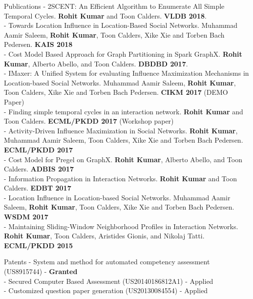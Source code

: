 \documentclass{resume} %
\begin{document}
\begin{rSection}{Publications}
- 2SCENT: An Efficient Algorithm to Enumerate All Simple Temporal Cycles. \textbf{Rohit Kumar} and Toon Calders. \textbf{VLDB 2018}.\\
- Towards Location Influence in Location-Based Social Networks. Muhammad Aamir Saleem, \textbf{Rohit Kumar}, Toon Calders, Xike Xie and Torben Bach Pedersen. \textbf{KAIS 2018}\\
- Cost Model Based Approach for Graph Partitioning in Spark GraphX.
 \textbf{Rohit Kumar}, Alberto Abello, and Toon Calders. \textbf{DBDBD 2017}.\\
- IMaxer: A Unified System for evaluating Influence Maximization Mechanisms in Location-based Social Networks.
 Muhammad Aamir Saleem, \textbf{Rohit Kumar}, Toon Calders, Xike Xie and Torben Bach Pedersen. \textbf{CIKM 2017} (DEMO Paper)\\
- Finding simple temporal cycles in an interaction network.
 \textbf{Rohit Kumar} and Toon Calders. \textbf{ECML/PKDD 2017} (Workshop paper)\\
- Activity-Driven Influence Maximization in Social Networks.
 \textbf{Rohit Kumar}, Muhammad Aamir Saleem, Toon Calders, Xike Xie and Torben
Bach Pedersen. \textbf{ECML/PKDD 2017}\\
- Cost Model for Pregel on GraphX.
 \textbf{Rohit Kumar}, Alberto Abello, and Toon Calders. \textbf{ADBIS 2017}\\
- Information Propagation in Interaction Networks.
 \textbf{Rohit Kumar} and Toon Calders.\textbf{ EDBT 2017}\\
- Location Influence in Location-based Social Networks.
 Muhammad Aamir Saleem, \textbf{Rohit Kumar}, Toon Calders, Xike Xie and Torben Bach Pedersen. \textbf{WSDM 2017}\\
- Maintaining Sliding-Window Neighborhood Profiles in Interaction Networks.
 \textbf{Rohit Kumar}, Toon Calders, Aristides Gionis, and Nikolaj Tatti. \textbf{ECML/PKDD 2015}\\
\end{rSection}
\begin{rSection}{Patents}
- System and method for automated competency assessment (US8915744) - \textbf{Granted}\\ %
- Secured Computer Based Assessment (US20140186812A1) - Applied\\ %
- Customized question paper generation (US20130084554) - Applied %
\end{rSection}
\end{document}
